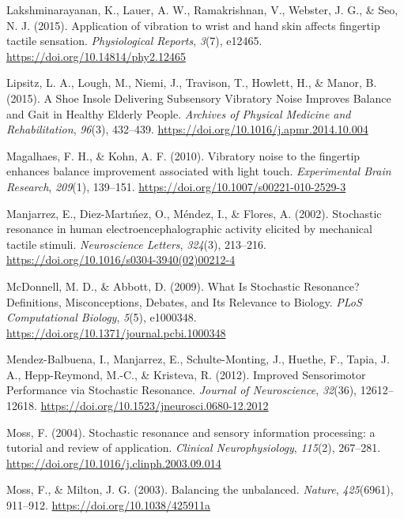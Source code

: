 \documentclass[]{cik}%
\newlength{\cslhangindent}
\newlength{\cslentryspacingunit} %
\newenvironment{CSLReferences}[2] %
 {%
  \setlength{\parindent}{0pt}
  \ifodd #1
  \let\oldpar\par
  \def\par{\hangindent=\cslhangindent\oldpar}
  \fi
  \setlength{\parskip}{#2\cslentryspacingunit}
 }%
 {}
\begin{document}
\begin{CSLReferences}{1}{0}
\leavevmode{}%
Lakshminarayanan, K., Lauer, A. W., Ramakrishnan, V., Webster, J. G., \&
Seo, N. J. (2015). Application of vibration to wrist and hand skin
affects fingertip tactile sensation. \emph{Physiological Reports},
\emph{3}(7), e12465. \url{https://doi.org/10.14814/phy2.12465}

\leavevmode{}%
Lipsitz, L. A., Lough, M., Niemi, J., Travison, T., Howlett, H., \&
Manor, B. (2015). A Shoe Insole Delivering Subsensory Vibratory Noise
Improves Balance and Gait in Healthy Elderly People. \emph{Archives of
Physical Medicine and Rehabilitation}, \emph{96}(3), 432--439.
\url{https://doi.org/10.1016/j.apmr.2014.10.004}

\leavevmode{}%
Magalhaes, F. H., \& Kohn, A. F. (2010). Vibratory noise to the
fingertip enhances balance improvement associated with light touch.
\emph{Experimental Brain Research}, \emph{209}(1), 139--151.
\url{https://doi.org/10.1007/s00221-010-2529-3}

\leavevmode{}%
Manjarrez, E., Diez-Martıńez, O., Méndez, I., \& Flores, A. (2002).
Stochastic resonance in human electroencephalographic activity elicited
by mechanical tactile stimuli. \emph{Neuroscience Letters},
\emph{324}(3), 213--216.
\url{https://doi.org/10.1016/s0304-3940(02)00212-4}

\leavevmode{}%
McDonnell, M. D., \& Abbott, D. (2009). What Is Stochastic Resonance?
Definitions, Misconceptions, Debates, and Its Relevance to Biology.
\emph{PLoS Computational Biology}, \emph{5}(5), e1000348.
\url{https://doi.org/10.1371/journal.pcbi.1000348}

\leavevmode{}%
Mendez-Balbuena, I., Manjarrez, E., Schulte-Monting, J., Huethe, F.,
Tapia, J. A., Hepp-Reymond, M.-C., \& Kristeva, R. (2012). Improved
Sensorimotor Performance via Stochastic Resonance. \emph{Journal of
Neuroscience}, \emph{32}(36), 12612--12618.
\url{https://doi.org/10.1523/jneurosci.0680-12.2012}

\leavevmode{}%
Moss, F. (2004). Stochastic resonance and sensory information
processing: a tutorial and review of application. \emph{Clinical
Neurophysiology}, \emph{115}(2), 267--281.
\url{https://doi.org/10.1016/j.clinph.2003.09.014}

\leavevmode{}%
Moss, F., \& Milton, J. G. (2003). Balancing the unbalanced.
\emph{Nature}, \emph{425}(6961), 911--912.
\url{https://doi.org/10.1038/425911a}


\end{CSLReferences}
\end{document}
